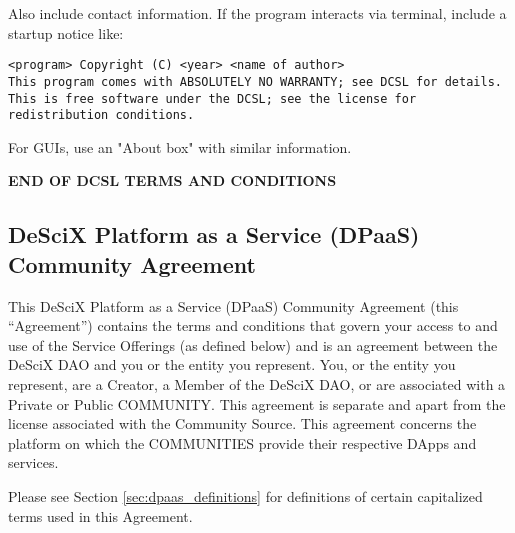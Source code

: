\documentclass{article}
\begin{document}
Also include contact information. If the program interacts via terminal, include a startup notice like:

\begin{verbatim}
<program> Copyright (C) <year> <name of author>
This program comes with ABSOLUTELY NO WARRANTY; see DCSL for details.
This is free software under the DCSL; see the license for redistribution conditions.
\end{verbatim}

For GUIs, use an "About box" with similar information.

\textbf{END OF DCSL TERMS AND CONDITIONS}
\subsection{DeSciX Platform as a Service (DPaaS) Community Agreement} \label{sec:dpaas}

This DeSciX Platform as a Service (DPaaS) Community Agreement (this “Agreement”) contains the terms and conditions that govern your access to and use of the Service Offerings (as defined below) and is an agreement between the DeSciX DAO and you or the entity you represent. You, or the entity you represent, are a Creator, a Member of the DeSciX DAO, or are associated with a Private or Public COMMUNITY. This agreement is separate and apart from the license associated with the Community Source. This agreement concerns the platform on which the COMMUNITIES provide their respective DApps and services.

Please see Section \ref{sec:dpaas_definitions} for definitions of certain capitalized terms used in this Agreement.
\end{document}
